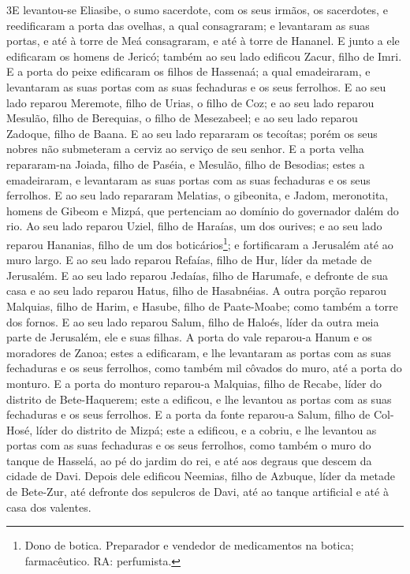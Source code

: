 \lettrine{3} E levantou-se Eliasibe, o sumo sacerdote, com os
seus irmãos, os sacerdotes, e reedificaram a porta das ovelhas, a
qual consagraram; e levantaram as suas portas, e até à torre de Meá
consagraram, e até à torre de Hananel. E junto a ele edificaram
os homens de Jericó; também ao seu lado edificou Zacur, filho de
Imri. E a porta do peixe edificaram os filhos de Hassenaá; a
qual emadeiraram, e levantaram as suas portas com as suas fechaduras
e os seus ferrolhos. E ao seu lado reparou Meremote, filho de
Urias, o filho de Coz; e ao seu lado reparou Mesulão, filho de
Berequias, o filho de Mesezabeel; e ao seu lado reparou Zadoque,
filho de Baana. E ao seu lado repararam os tecoítas; porém os
seus nobres não submeteram a cerviz ao serviço de seu senhor. E
a porta velha repararam-na Joiada, filho de Paséia, e Mesulão, filho
de Besodias; estes a emadeiraram, e levantaram as suas portas com as
suas fechaduras e os seus ferrolhos. E ao seu lado repararam
Melatias, o gibeonita, e Jadom, meronotita, homens de Gibeom e
Mizpá, que pertenciam ao domínio do governador dalém do rio. Ao
seu lado reparou Uziel, filho de Haraías, um dos ourives; e ao seu
lado reparou Hananias, filho de um dos boticários\footnote{Dono de
botica. Preparador e vendedor de medicamentos na botica;
farmacêutico. RA: perfumista.}; e fortificaram a Jerusalém até ao
muro largo. E ao seu lado reparou Refaías, filho de Hur, líder
da metade de Jerusalém. E ao seu lado reparou Jedaías, filho
de Harumafe, e defronte de sua casa e ao seu lado reparou Hatus,
filho de Hasabnéias. A outra porção reparou Malquias, filho
de Harim, e Hasube, filho de Paate-Moabe; como também a torre dos
fornos. E ao seu lado reparou Salum, filho de Haloés, líder
da outra meia parte de Jerusalém, ele e suas filhas. A porta
do vale reparou-a Hanum e os moradores de Zanoa; estes a edificaram,
e lhe levantaram as portas com as suas fechaduras e os seus
ferrolhos, como também mil côvados do muro, até a porta do monturo.
E a porta do monturo reparou-a Malquias, filho de Recabe,
líder do distrito de Bete-Haquerem; este a edificou, e lhe levantou
as portas com as suas fechaduras e os seus ferrolhos. E a
porta da fonte reparou-a Salum, filho de Col-Hosé, líder do distrito
de Mizpá; este a edificou, e a cobriu, e lhe levantou as portas com
as suas fechaduras e os seus ferrolhos, como também o muro do tanque
de Hasselá, ao pé do jardim do rei, e até aos degraus que descem da
cidade de Davi. Depois dele edificou Neemias, filho de
Azbuque, líder da metade de Bete-Zur, até defronte dos sepulcros de
Davi, até ao tanque artificial e até à casa dos valentes.
